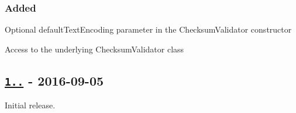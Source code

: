 \subsubsection*{Added}


\begin{DoxyItemize}
\item Optional {\ttfamily default\+Text\+Encoding} parameter in the {\ttfamily Checksum\+Validator} constructor
\item Access to the underlying {\ttfamily Checksum\+Validator} class
\end{DoxyItemize}

\subsection*{\href{https://github.com/malept/sumchecker/releases/tag/v1.0.0}{\tt 1..} -\/ 2016-\/09-\/05}

Initial release. 